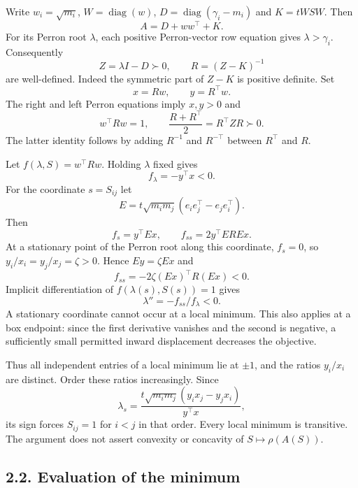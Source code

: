 \documentclass[
  11pt,
  a4paper,
]{article}
\begin{document}
Write \(w_i=\sqrt{m_i}\), \(W=\operatorname{diag}(w)\),
\(D=\operatorname{diag}(\gamma_i-m_i)\) and \(K=tWSW\). Then
\[A=D+ww^\top+K.\] For its Perron root \(\lambda\), each positive
Perron-vector row equation gives \(\lambda>\gamma_i\). Consequently
\[Z=\lambda I-D\succ0,\qquad R=(Z-K)^{-1}\] are well-defined. Indeed the
symmetric part of \(Z-K\) is positive definite. Set
\[x=Rw,\qquad y=R^\top w.\] The right and left Perron equations imply
\(x,y>0\) and
\[w^\top Rw=1,\qquad \frac{R+R^\top}{2}=R^\top ZR\succ0.       \tag{2.3}\]
The latter identity follows by adding \(R^{-1}\) and \(R^{-\top}\)
between \(R^\top\) and \(R\).

Let \(f(\lambda,S)=w^\top Rw\). Holding \(\lambda\) fixed gives
\[f_\lambda=-y^\top x<0.\] For the coordinate \(s=S_{ij}\) let
\[E=t\sqrt{m_im_j}(e_ie_j^\top-e_je_i^\top).\] Then
\[f_s=y^\top Ex,\qquad f_{ss}=2y^\top ERE x.                 \tag{2.4}\]
At a stationary point of the Perron root along this coordinate,
\(f_s=0\), so \(y_i/x_i=y_j/x_j=\zeta>0\). Hence \(Ey=\zeta Ex\) and
\[f_{ss}=-2\zeta(Ex)^\top R(Ex)<0.\] Implicit differentiation of
\(f(\lambda(s),S(s))=1\) gives
\[\lambda''=-f_{ss}/f_\lambda<0.                             \tag{2.5}\]
A stationary coordinate cannot occur at a local minimum. This also
applies at a box endpoint: since the first derivative vanishes and the
second is negative, a sufficiently small permitted inward displacement
decreases the objective.

Thus all independent entries of a local minimum lie at \(\pm1\), and the
ratios \(y_i/x_i\) are distinct. Order these ratios increasingly. Since
\[
 \lambda_s=
 \frac{t\sqrt{m_im_j}(y_ix_j-y_jx_i)}{y^\top x},              \tag{2.6}
\] its sign forces \(S_{ij}=1\) for \(i<j\) in that order. Every local
minimum is transitive. The argument does not assert convexity or
concavity of \(S\mapsto\rho(A(S))\).

\subsection{2.2. Evaluation of the
minimum}\label{evaluation-of-the-minimum}
\end{document}
